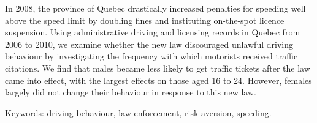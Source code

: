 

In 2008, the province of Quebec drastically increased penalties for speeding 
well above the speed limit by doubling fines and instituting on-the-spot licence suspension. 
Using administrative driving and licensing records in Quebec from 2006 to 2010, 
we examine whether the new law discouraged unlawful driving behaviour 
by investigating the frequency with which motorists received traffic citations. 
We find that males became less likely to get traffic tickets after the law came into effect, 
with the largest effects on those aged 16 to 24. 
However, females largely did not change their behaviour in response to this new law. 

\medskip
\noindent
Keywords: driving behaviour, law enforcement, risk aversion, speeding.
